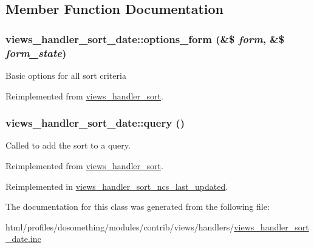 \subsection{Member Function Documentation}
\hypertarget{classviews__handler__sort__date_a622c39d35c93e620cc6fa6ae2ab37ab4}{
\subsubsection[{options\_\-form}]{\setlength{\rightskip}{0pt plus 5cm}views\_\-handler\_\-sort\_\-date::options\_\-form (\&\$ {\em form}, \/  \&\$ {\em form\_\-state})}}
\label{classviews__handler__sort__date_a622c39d35c93e620cc6fa6ae2ab37ab4}
Basic options for all sort criteria 

Reimplemented from \hyperlink{classviews__handler__sort_aba953218e09ab9da8f6ed0a67f046455}{views\_\-handler\_\-sort}.\hypertarget{classviews__handler__sort__date_a3d3680d96fee82a746bac50c051016a8}{
\subsubsection[{query}]{\setlength{\rightskip}{0pt plus 5cm}views\_\-handler\_\-sort\_\-date::query ()}}
\label{classviews__handler__sort__date_a3d3680d96fee82a746bac50c051016a8}
Called to add the sort to a query. 

Reimplemented from \hyperlink{classviews__handler__sort_a94fa33c5d037e41a927583fce2df3d18}{views\_\-handler\_\-sort}.

Reimplemented in \hyperlink{classviews__handler__sort__ncs__last__updated_a05d2ef9eb8727ee81915b34254d99355}{views\_\-handler\_\-sort\_\-ncs\_\-last\_\-updated}.

The documentation for this class was generated from the following file:\begin{DoxyCompactItemize}
\item 
html/profiles/dosomething/modules/contrib/views/handlers/\hyperlink{views__handler__sort__date_8inc}{views\_\-handler\_\-sort\_\-date.inc}\end{DoxyCompactItemize}
